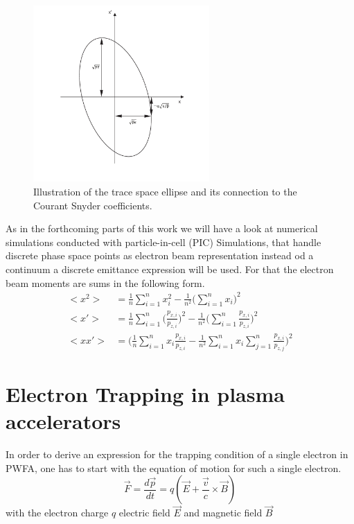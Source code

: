 \begin{figure}[htbp]
\begin{center}
\includegraphics[width=0.6\textwidth]{theory/images/edited/TraceSpaceCourantSnyder.pdf}
\end{center}
\caption{Illustration of the trace space ellipse and its connection to the Courant Snyder coefficients.}
\label{img:TraceSpace}
\end{figure}
As in the forthcoming parts of this work we will have a look at numerical simulations conducted with particle-in-cell (PIC) Simulations, that handle discrete phase space points as electron beam representation instead od a continuum a discrete emittance expression will be used. For that the electron beam moments are sums in the following form.
\begin{align}
<x^2>&=\frac{1}{n} \sum_{i=1}^{n} x_i^2-\frac{1}{n^2}\Big(\sum_{i=1}^{n} x_i\Big)^2\\
<x'>&=\frac{1}{n} \sum_{i=1}^{n}\Big(\frac{p_{x,i}}{p_{z,i}}\Big)^2-\frac{1}{n^2}\Big(\sum_{i=1}^{n}\frac{p_{x,i}}{p_{z,i}}\Big)^2\\
<xx'>&=\Big(\frac{1}{n}\sum_{i=1}^{n}x_i\frac{p_{x,i}}{p_{z,i}}-\frac{1}{n^2}\sum_{i=1}^{n}x_i \sum_{j=1}^{n}\frac{p_{x,i}}{p_{z,j}}\Big)^2
\end{align}



\section{Electron Trapping in plasma accelerators}
\label{sec:Theory_Trapping}


In order to derive an expression for the trapping condition of a single electron in PWFA, one has to start with the equation of motion for such a single electron. 
\begin{equation}
\vec{F}=\frac{d\vec{p}}{dt}=q(\vec{E}+\frac{\vec{v}}{c}\times\vec{B})
\end{equation}
with the electron charge $q$ electric field $\vec{E}$ and magnetic field $\vec{B}$

